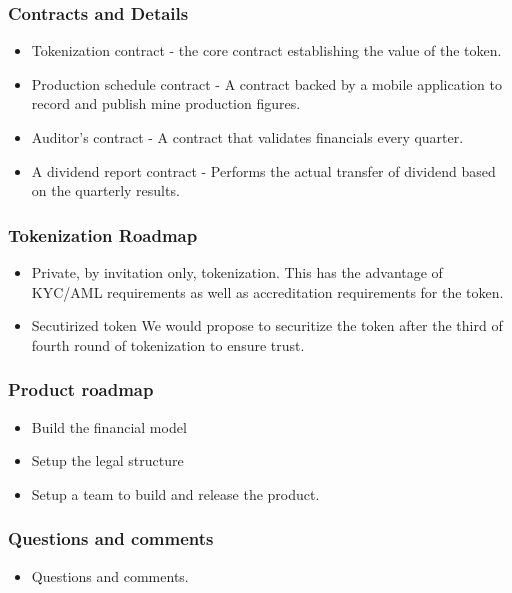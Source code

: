 \documentclass{beamer}
\begin{document}
\begin{frame}
  \frametitle {Contracts and Details}
  \begin{minipage}{\textwidth}
    \begin{itemize}
    \item  Tokenization contract - the core contract establishing the value of the token.
    \item  Production schedule contract - A contract backed by a mobile application to record and publish mine production figures.
    \item  Auditor's contract - A contract that validates financials every quarter.
    \item  A dividend report contract - Performs the actual transfer of dividend based on the quarterly results.
    \end{itemize}
  \end{minipage}
\end{frame}

\begin{frame}
  \frametitle {Tokenization Roadmap}
  \begin{minipage}{\textwidth}
    \begin{itemize}
    \item  Private, by invitation only, tokenization.
      This has the advantage of KYC/AML requirements as well as accreditation requirements for the token.
    \item  Secutirized token
      We would propose to securitize the token after the third of fourth round of tokenization to ensure trust.
    \end{itemize}
  \end{minipage}
\end{frame}

\begin{frame}
  \frametitle {Product roadmap}
  \begin{minipage}{\textwidth}
    \begin{itemize}
      \item  Build the financial model
      \item  Setup the legal structure
      \item  Setup a team to build and release the product.
    \end{itemize}
  \end{minipage}
\end{frame}

\begin{frame}
  \frametitle {Questions and comments}
  \begin{minipage}{\textwidth}
    \begin{itemize}
      \item  Questions and comments.
    \end{itemize}
  \end{minipage}
\end{frame}
\end{document}
